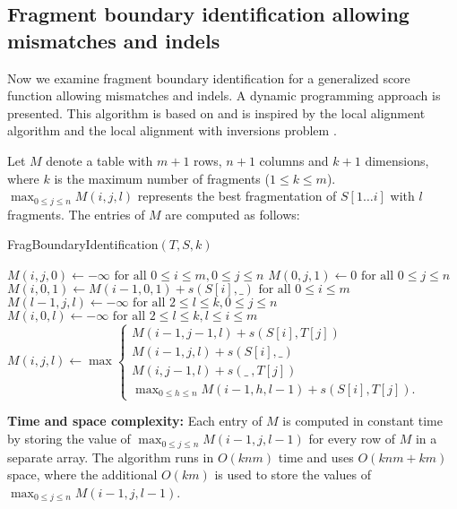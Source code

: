 \subsection{Fragment boundary identification allowing mismatches and indels}
Now we examine fragment boundary identification for a generalized score
function allowing mismatches and indels. A dynamic programming approach
is presented. This algorithm is based on and is inspired by the local
alignment algorithm \citep{smith1981identification} and the local
alignment with inversions problem \citep{schoniger1992local}.

Let $M$ denote a table with $m+1$ rows, $n+1$ columns and $k+1$
dimensions, where $k$ is the maximum number of fragments ($1 \leq k \leq
m$).  $\max_{0 \leq j \leq n}M(i,j,l)$ represents the best fragmentation
of $S[1 \dots i]$ with $l$ fragments. The entries of $M$ are computed as
follows:

\begin{algorithm}[H]
\caption{FragBoundaryIdentification$(T, S, k)$}
\begin{algorithmic}[1]
  \STATE $M(i,j,0) \leftarrow -\infty
          \text{ for all } 0 \leq i \leq m, 0 \leq j \leq n$
  \STATE $M(0,j,1) \leftarrow 0 \text{ for all } 0 \leq j \leq n$
  \STATE $M(i,0,1) \leftarrow M(i-1,0,1) + s(S[i], \_)
          \text{ for all } 0 \leq i \leq m$
  \STATE $M(l-1,j,l) \leftarrow -\infty \text{ for all } 2 \leq l \leq k,
          0 \leq j \leq n$
  \STATE $M(i,0,l) \leftarrow -\infty \text{ for all } 2 \leq l \leq k,
          l \leq i \leq m$
        \STATE $M(i,j,l) \leftarrow \max
          \begin{cases}
            M(i-1,j-1,l) + s(S[i], T[j]) \\
            M(i-1,j,l) + s(S[i], \_) \\
            M(i,j-1,l) + s(\_\ , T[j]) \\
            \max_{0 \leq h \leq n}M(i-1,h,l-1) + s(S[i], T[j]).
          \end{cases} $
      \ENDFOR
    \ENDFOR
  \ENDFOR
\end{algorithmic}
\label{gen_frag_id_alg}
\end{algorithm}

\noindent
\textbf{Time and space complexity:} Each entry of $M$ is computed in
constant time by storing the value of $\max_{0 \leq j \leq
n}M(i-1,j,l-1)$ for every row of $M$ in a separate array. The algorithm
runs in $O(knm)$ time and uses $O(knm + km)$ space, where the additional
$O(km)$ is used to store the values of $\max_{0 \leq j \leq
n}M(i-1,j,l-1)$.

